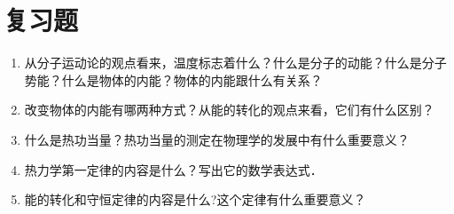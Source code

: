 \section*{复习题}
\begin{enumerate}
\item 从分子运动论的观点看来，温度标志着什么？什么是分子的动能？什么是分子势能？什么是物体的内能？物体的内能跟什么有关系？
\item 改变物体的内能有哪两种方式？从能的转化的观点来看，它们有什么区别？
\item 什么是热功当量？热功当量的测定在物理学的发展中有什么重要意义？
\item 热力学第一定律的内容是什么？写出它的数学表达式．
\item 能的转化和守恒定律的内容是什么?这个定律有什么重要意义？
\end{enumerate}




